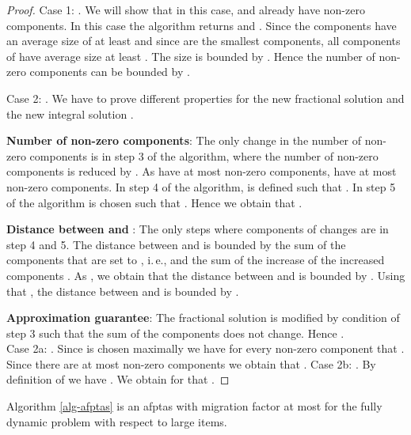 \begin{proof}
    Case 1: . We will show that in this case,  and  already have  non-zero components. In this case the algorithm returns  and . Since  the components  have an average size of at least  and since  are the smallest components, all components of  have average size at least . The size  is bounded by . Hence the number of non-zero components can be bounded by .

Case 2: . We have to prove different properties for the new fractional solution  and the new integral solution .

\textbf{Number of non-zero components}: The only change in the number of non-zero components is in step 3 of the algorithm, where the number of non-zero components is reduced by . As  have at most  non-zero components,  have at most  non-zero components. In step 4 of the algorithm,  is defined such that . In step 5 of the algorithm  is chosen such that . Hence we obtain that .

\textbf{Distance between  and }: The only steps where components of  changes are in step 4 and 5. The distance between  and  is bounded by the sum of the components that are set to , i.\,e.,  and the sum of the increase of the increased components . As , we obtain that the distance between  and  is bounded by . Using that , the distance between  and  is bounded by .

\textbf{Approximation guarantee}: The fractional solution  is modified by condition of step 3 such that the sum of the components does not change. Hence .\\
Case 2a: . Since  is chosen maximally we have for every non-zero component that . Since there are at most  non-zero components we obtain that .
Case 2b: .
By definition of  we have . We obtain for  that .
\end{proof}

\begin{theorem}
\label{thm-main}
Algorithm \ref{alg-afptas} is an \ac{afptas} with migration factor at most  for the fully dynamic \BP problem with respect to large items.
\end{theorem}

